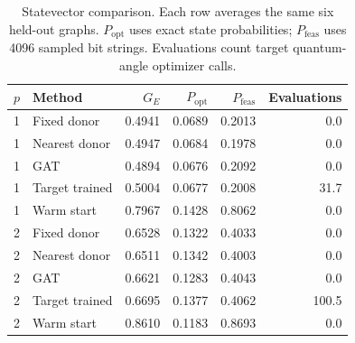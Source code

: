 \begin{table}[tb]
\centering
\small
\caption{Statevector comparison. Each row averages the same six held-out graphs. $P_{\mathrm{opt}}$ uses exact state probabilities; $P_{\mathrm{feas}}$ uses 4096 sampled bit strings. Evaluations count target quantum-angle optimizer calls.}
\label{tab:transfer}
\begin{tabular}{llrrrr}
\toprule
$p$ & Method & $G_E$ & $P_{\mathrm{opt}}$ & $P_{\mathrm{feas}}$ & Evaluations \\
\midrule
1 & Fixed donor & 0.4941 & 0.0689 & 0.2013 & 0.0 \\
1 & Nearest donor & 0.4947 & 0.0684 & 0.1978 & 0.0 \\
1 & GAT & 0.4894 & 0.0676 & 0.2092 & 0.0 \\
1 & Target trained & 0.5004 & 0.0677 & 0.2008 & 31.7 \\
1 & Warm start & 0.7967 & 0.1428 & 0.8062 & 0.0 \\
\midrule
2 & Fixed donor & 0.6528 & 0.1322 & 0.4033 & 0.0 \\
2 & Nearest donor & 0.6511 & 0.1342 & 0.4003 & 0.0 \\
2 & GAT & 0.6621 & 0.1283 & 0.4043 & 0.0 \\
2 & Target trained & 0.6695 & 0.1377 & 0.4062 & 100.5 \\
2 & Warm start & 0.8610 & 0.1183 & 0.8693 & 0.0 \\
\bottomrule
\end{tabular}
\end{table}
